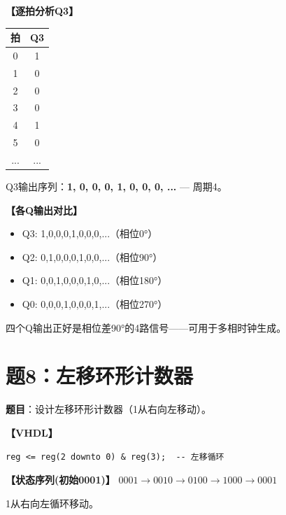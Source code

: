 \begin{solution}[完整解答]

\textbf{【逐拍分析Q3】}
\begin{center}
\begin{tabular}{|c|c|}\hline
拍 & Q3 \\ \hline
0 & 1 \\ \hline 1 & 0 \\ \hline 2 & 0 \\ \hline 3 & 0 \\ \hline
4 & 1 \\ \hline 5 & 0 \\ \hline ... & ... \\ \hline
\end{tabular}
\end{center}

Q3输出序列：\textbf{1, 0, 0, 0, 1, 0, 0, 0, ...} — 周期4。

\textbf{【各Q输出对比】}
\begin{itemize}
  \item Q3: 1,0,0,0,1,0,0,0,...（相位0°）
  \item Q2: 0,1,0,0,0,1,0,0,...（相位90°）
  \item Q1: 0,0,1,0,0,0,1,0,...（相位180°）
  \item Q0: 0,0,0,1,0,0,0,1,...（相位270°）
\end{itemize}

四个Q输出正好是相位差90°的4路信号——可用于多相时钟生成。

\end{solution}


\section{题8：左移环形计数器}

\textbf{题目}：设计左移环形计数器（1从右向左移动）。

\begin{solution}[完整解答]

\textbf{【VHDL】}
\begin{lstlisting}
reg <= reg(2 downto 0) & reg(3);  -- 左移循环
\end{lstlisting}

\textbf{【状态序列(初始0001)】}
$0001\to0010\to0100\to1000\to0001$

1从右向左循环移动。

\end{solution}


